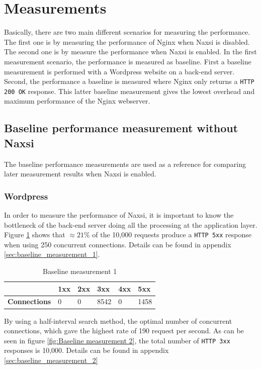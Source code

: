 \documentclass[Measurements]{subfiles}
\begin{document}
\section{Measurements}

\label{sec:Measurements}
Basically, there are two main different scenarios for measuring the performance. The first one is by measuring the performance of Nginx when Naxsi is disabled. The second one is by measure the performance when Naxsi is enabled.  In the first measurement scenario, the performance is measured as baseline. First a baseline measurement is performed with a Wordpress website on a back-end server. Second, the performance a baseline is measured where Nginx only returns a \verb+HTTP 200 OK+ response. This latter baseline measurement gives the lowest overhead and maximum performance of the Nginx webserver.

\subsection{Baseline performance measurement without Naxsi}
The baseline performance measurements are used as a reference for comparing later measurement results when Naxsi is enabled.

\subsubsection{Wordpress}
\label{sec:Baseline performance measurement}
In order to measure the performance of Naxsi, it is important to know the bottleneck of the back-end server doing all the processing at the application layer. Figure \ref{fig:Baseline measurement 1} shows that $\approx 21\%$ of the 10,000 requests produce a \verb+HTTP 5xx+ response when using 250 concurrent connections. Details can be found in appendix \ref{sec:baseline_measurement_1}.

\begin{table}[H]
\caption{Baseline measurement 1}
\begin{tabular}{|p{2cm}|p{}|p{}|p{}|p{}|p{}|}
\hline
 & \textbf{1xx} & \textbf{2xx} & \textbf{3xx} & \textbf{4xx} & \textbf{5xx} \\ \hline
\textbf{Connections} & 0 & 0 & 8542 & 0 & 1458 \\ \hline
\end{tabular}
\label{fig:Baseline measurement 1}
\end{table}

By using a half-interval search method, the optimal number of concurrent connections, which gave the highest rate of 190 request per second. As can be seen in figure \ref{fig:Baseline measurement 2}, the total number of \verb+HTTP 3xx+ responses is 10,000. Details can be found in appendix \ref{sec:baseline_measurement_2}
\end{document}
